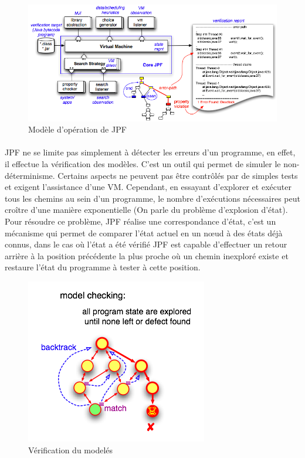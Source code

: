 			\begin{figure}[H]
				\centering
					\includegraphics[scale=0.5]{images/jpf-model.png}
				\caption{Modèle d'opération de \gls{JPF}}
			\end{figure}
	
			\paragraph{}
				\gls{JPF} ne se limite pas simplement à détecter les erreurs d'un programme, en effet, il effectue la vérification des modèles.
				C'est un outil qui permet de simuler le non-déterminisme. Certains aspects ne peuvent pas être contrôlés par de simples tests et exigent l'assistance d'une \gls{VM}.
				Cependant, en essayant d'explorer et exécuter tous les chemins au sein d'un programme, le nombre d'exécutions nécessaires peut croître d'une manière exponentielle (On parle du problème d'explosion d'état). 
				Pour résoudre ce problème, \gls{JPF} réalise une correspondance d'état, c'est un mécanisme qui permet de comparer
				l'état actuel en un n\oe{}ud à des états déjà connus, dans le cas où l'état
				a été vérifié \gls{JPF} est capable d'effectuer un retour arrière à la position précédente la plus proche où un chemin inexploré existe et restaure l'état du programme à tester à cette position.
	
			\begin{figure}[H]
				\centering
					\includegraphics[scale=0.5]{images/jpf-model-checking.png}
				\caption{Vérification du modelés}
			\end{figure}
      
